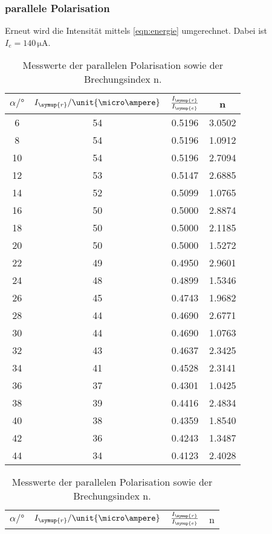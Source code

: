 \subsubsection{parallele Polarisation}
Erneut wird die Intensität mittels \autoref{eqn:energie} umgerechnet. Dabei ist $I_e = 140 \, \unit{\micro\ampere}$. 
\begin{table}
    \centering
    \caption{Messwerte der parallelen Polarisation sowie der Brechungsindex n.}
    \begin{tabular}{c c c c}
        \toprule
        $\alpha \mathrm{/} \unit{\degree}$  & $I_{\symup{r}}\mathrm{/}\unit{\micro\ampere}$ & $\frac{I_{\symup{r}}}{I_{\symup{e}}}$ & n\\
        \midrule
        6 & 54 & 0.5196 & 3.0502 \\
        8 & 54 & 0.5196 & 1.0912 \\
       10 & 54 & 0.5196 & 2.7094 \\
       12 & 53 & 0.5147 & 2.6885 \\
       14 & 52 & 0.5099 & 1.0765 \\
        16 & 50 & 0.5000 & 2.8874 \\
        18 & 50 & 0.5000 & 2.1185 \\
        20 & 50 & 0.5000 & 1.5272 \\
       22 & 49 & 0.4950 & 2.9601 \\
       24 & 48 & 0.4899 & 1.5346 \\
       26 & 45 & 0.4743 & 1.9682 \\
       28 & 44 & 0.4690 & 2.6771 \\
       30 & 44 & 0.4690 & 1.0763 \\
       32 & 43 & 0.4637 & 2.3425 \\
       34 & 41 & 0.4528 & 2.3141 \\
       36 & 37 & 0.4301 & 1.0425 \\
       38 & 39 & 0.4416 & 2.4834 \\
       40 & 38 & 0.4359 & 1.8540 \\
       42 & 36 & 0.4243 & 1.3487 \\
       44 & 34 & 0.4123 & 2.4028 \\
       \bottomrule
    \end{tabular}
    \quad
    \begin{tabular}{c c c c}
        \toprule
        $\alpha \mathrm{/} \unit{\degree}$  & $I_{\symup{r}}\mathrm{/}\unit{\micro\ampere}$ & $\frac{I_{\symup{r}}}{I_{\symup{e}}}$ & n\\

\end{tabular}
\end{table}
